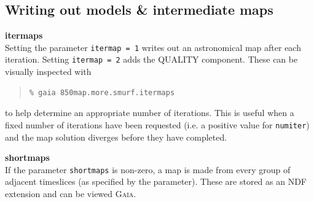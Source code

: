 \documentclass[twoside,11pt]{article}
\newcommand{\xref}[3]{#1}
\newcommand{\xlabel}[1]{}
\renewcommand{\_}{\texttt{\symbol{95}}}
\newenvironment{myquote}{
   \color{MidnightBlue}\begin{quote}\begin{small}}{
   \end{small}\end{quote}
}
\newcommand{\gaia}{\xref{\textsc{Gaia}}{sun214}{}}
\newcommand{\param}[1]{\texttt{#1}}
\renewenvironment{myquote}{
      \begin{quote}\begin{small}}{
      \end{small}\end{quote}
   }
\begin{document}
\subsection{\xlabel{inter}Writing out models \& intermediate maps}


\textbf{itermaps}\\
Setting the parameter \param{itermap~=~1} writes out an astronomical map after each
iteration. Setting \param{itermap~=~2} adds the QUALITY component.
These can be visually inspected with

\begin{myquote}
\begin{verbatim}
% gaia 850map.more.smurf.itermaps
\end{verbatim}
\end{myquote}
to help determine an appropriate number of iterations. This is useful
when a fixed number of iterations have been requested (i.e. a positive
value for \param{numiter}) and the map solution diverges before
they have completed.

\textbf{shortmaps}\\
If the parameter \param{shortmaps} is non-zero, a map is made from
every group of adjacent timeslices (as specified by the parameter).
These are stored as an NDF extension and can be viewed \gaia.
\end{document}
